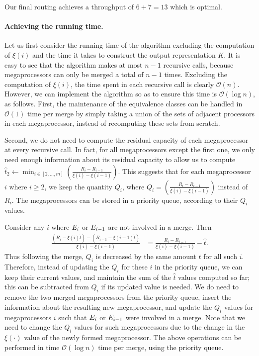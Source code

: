 \documentclass{article}
\newcounter{ass}
\newcommand{\ens}[1]{\ensuremath{#1}}					\newcommand{\card}[1]{\ens{|#1|}}							\newcommand{\dotlist}[2]{\ens{#1,\ldots,#2}}
\newcommand{\bigoh}[1]{\ens{\mathcal{O}(#1)}}				\newcommand{\bigom}[1]{\ens{\Omega(#1)}}
\newcommand{\valn}{\ens{n}}
\newcommand{\processor}{processor}
\newcommand{\megaprocessor}{mega\processor}
\begin{document}
Our final routing achieves a throughput of $6 + 7 = 13$ which is optimal.



\paragraph{Achieving the running time.}

Let us first consider the running time of the algorithm excluding the computation of $\xi(i)$ and the time it takes to construct the output representation $K$. 
It is easy to see that the algorithm makes at most $\valn -1$ recursive calls, because {\megaprocessor}s can only be merged a total of $\valn -1$ times. 
Excluding the computation of $\xi(i)$, the time spent in each recursive call is clearly $\bigoh{n}$. 
However, we can implement the algorithm so as to ensure this time is \bigoh{\log \valn}, as follows. 
First, the maintenance of the equivalence classes can be handled in \bigoh{1} time per merge by simply taking a union of the sets of adjacent {\processor}s in each {\megaprocessor}, instead of recomputing these sets from scratch. 

Second, we do not need to compute the residual capacity of each {\megaprocessor} at every recursive call.
In fact, for all {\megaprocessor}s except the first one, we
only need enough information about its residual capacity to allow us to
compute
$\hat{t}_2 \leftarrow \min_{i\in [2,\ldots,m]} \left(\frac{R_i - R_{i-1}}{\xi(i) - \xi(i-1)}\right)$.
This suggests that for each 
{\megaprocessor} $i$ where $i \geq 2$, we keep the quantity $Q_i$,
where $Q_i = \left(\frac{R_i - R_{i-1}}{\xi(i) - \xi(i-1)}\right)$ 
instead of $R_i$.  
The {\megaprocessor}s can be stored in a priority queue,
according to their $Q_i$ values.

Consider any $i$ where $\megaop i$ or $\megaop{i-1}$ are not involved in a merge. Then 
\begin{align*}
\frac{(R_{i} - \xi(i)\hat t) - (R_{i-1} - \xi(i-1)\hat t)}{\xi(i) - \xi(i-1)} &= 
\frac{R_{i} - R_{i-1}}{\xi(i) - \xi(i-1)} - \hat t. 
\end{align*}
Thus following the merge, $Q_i$ is decreased by the same amount $\hat t$ for
all such $i$.  Therefore, instead of updating the $Q_i$ for these $i$
in the priority queue,
we can keep their current values, and maintain the sum of the $\hat t$ values computed so far; this can be subtracted
from $Q_i$ if its updated value is needed.  
We do need
to remove the two merged {\megaprocessor}s from the priority queue,
insert the information about the resulting new {\megaprocessor},
and update the $Q_i$ values for {\megaprocessor}s $i$ such that $\megaop i$ 
or $\megaop {i-1}$ were involved in a merge. Note that we need to change the $Q_{i}$ values for such \megaprocessor s due to the change in the $\xi(\cdot)$ value of the newly formed \megaprocessor. 
The above operations can be performed in time
\bigoh{\log n} time per merge, using the priority queue.
\end{document}

